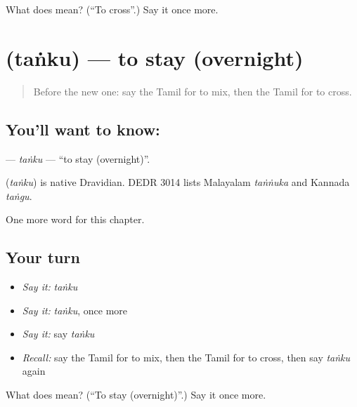 \begin{tcolorbox}[breakable,colback=teal!4,colframe=teal!35!black,title={Before you move on}]
What does  mean? (\textquotedblleft{}To cross\textquotedblright{}.) Say it once more.
\end{tcolorbox}
\section[\texorpdfstring{\ta{தங்கு} (taṅku)}{தங்கு (taṅku)}]{ (taṅku) — to stay (overnight)}

\label{lesson:TA-C162-tanku}



\begin{quote}
Before the new one: say the Tamil for to mix, then the Tamil for to cross.
\end{quote}

\subsection*{You'll want to know: }
\textbf{} — \emph{taṅku} — \textquotedblleft{}to stay (overnight)\textquotedblright{}.

\begin{cousinweb}
\textbf{} (\emph{taṅku}) is native Dravidian. DEDR 3014 lists Malayalam \emph{taṅṅuka} and Kannada \emph{taṅgu}.
\end{cousinweb}

\begin{grammarlens}[title={What you've built}]
One more word for this chapter.
\end{grammarlens}

\subsection*{Your turn}
\begin{itemize}
\raggedright
  \item \emph{Say it:} \emph{taṅku}
  \item \emph{Say it:} \emph{taṅku}, once more
  \item \emph{Say it:} say \emph{taṅku}
  \item \emph{Recall:} say the Tamil for to mix, then the Tamil for to cross, then say \emph{taṅku} again
\end{itemize}

\begin{tcolorbox}[breakable,colback=teal!4,colframe=teal!35!black,title={Before you move on}]
What does  mean? (\textquotedblleft{}To stay (overnight)\textquotedblright{}.) Say it once more.
\end{tcolorbox}
